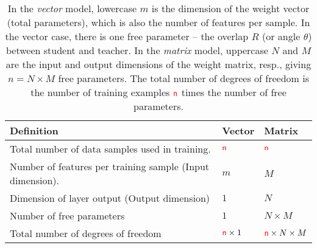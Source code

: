 \begin{table}[H]
\centering
\begin{tabular}{l|l|l}
\toprule
 \textbf{Definition} & \textbf{Vector} & \textbf{Matrix} \\
\midrule
 Total number of data samples used in training. & ${\color{red}\sf{n}}$ & ${\color{red}\sf{n}}$ \\
 Number of features per training sample (Input dimension). & $m$ & $M$ \\
 Dimension of layer output (Output dimension)  & $1$ & $N$ \\
 Number of free parameters & $1$ & $N\times M$ \\
 Total number of degrees of freedom & ${\color{red}\sf{n}}\times 1$ & ${\color{red}\sf{n}}\times N\times M$ \\
\bottomrule
\end{tabular}
\caption{In the \emph{vector} model, lowercase $m$ is the dimension of the weight vector (total parameters), which is also the number of features per sample. In the vector case, there is one free parameter -- the overlap $R$ (or angle $\theta$) between student and teacher. In the \emph{matrix} model, uppercase $N$ and $M$ are the input and output dimensions of the weight matrix, resp., giving $n=N\times M$ free parameters.
The total number of degrees of freedom is the number of training examples ${\color{red}\sf{n}}$ times the number of free parameters.}
\label{tab:dim_notation}
\end{table}

